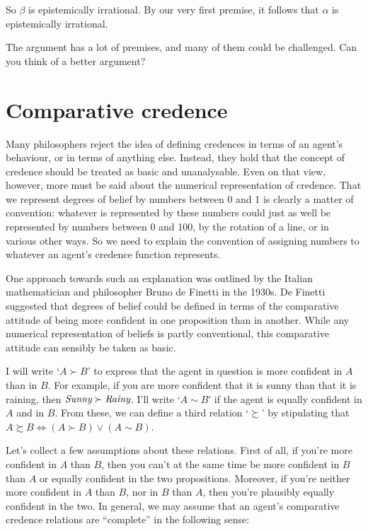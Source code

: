 So $\beta$  is epistemically irrational. By our very first premise, it
follows that $\alpha$ is epistemically irrational.

The argument has a lot of premises, and many of them could be
challenged. Can you think of a better argument?



\section{Comparative credence}\label{sec:comparative-credence}

Many philosophers reject the idea of defining credences in terms of an
agent's behaviour, or in terms of anything else. Instead, they hold
that the concept of credence should be treated as basic and
unanalysable. Even on that view, however, more must be said about the
numerical representation of credence. That we represent degrees of
belief by numbers between 0 and 1 is clearly a matter of convention:
whatever is represented by these numbers could just as well be
represented by numbers between 0 and 100, by the rotation of a line,
or in various other ways. So we need to explain the convention of
assigning numbers to whatever an agent's credence function represents.

One approach towards such an explanation was outlined by the Italian
mathematician and philosopher Bruno de Finetti in the 1930s. De
Finetti suggested that degrees of belief could be defined in terms of
the comparative attitude of being more confident in one proposition
than in another. While any numerical representation of beliefs is
partly conventional, this comparative attitude can sensibly be taken
as basic. 

I will write `$A \succ B$' to express that the agent in question is
more confident in $A$ than in $B$. For example, if you are more
confident that it is sunny than that it is raining, then $\emph{Sunny}
\succ \emph{Rainy}$. I'll write `$A \sim B$' if the agent is equally
confident in $A$ and in $B$. From these, we can define a third
relation `$\succsim$' by stipulating that $A \succsim B
\Leftrightarrow (A \succ B) \lor (A \sim B)$.

Let's collect a few assumptions about these relations. First of all,
if you're more confident in $A$ than $B$, then you can't at the same
time be more confident in $B$ than $A$ or equally confident in the two
propositions. Moreover, if you're neither more confident in $A$ than
$B$, nor in $B$ than $A$, then you're plausibly equally confident in
the two. In general, we may assume that an agent's comparative credence
relations are ``complete'' in the following sense:

